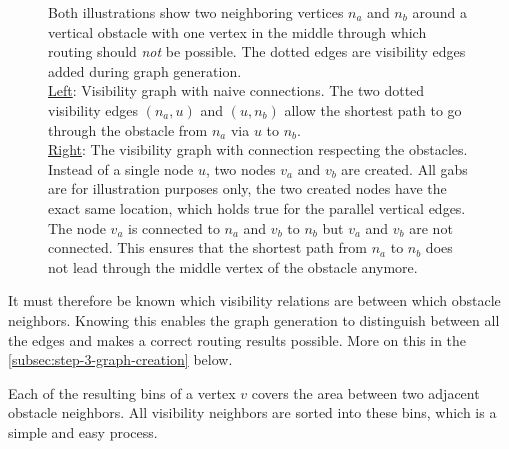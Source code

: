 \begin{figure}[h]
\begin{figcenter}
				\end{figcenter}
				\caption{
					Both illustrations show two neighboring vertices $n_a$ and $n_b$ around a vertical obstacle with one vertex in the middle through which routing should \emph{not} be possible.
					The dotted edges are visibility edges added during graph generation.
					\\
					\underline{Left}:
					Visibility graph with naive connections.
					The two dotted visibility edges $(n_a, u)$ and $(u, n_b)$ allow the shortest path to go through the obstacle from $n_a$ via $u$ to $n_b$.
					\\
					\underline{Right}:
					The visibility graph with connection respecting the obstacles. Instead of a single node $u$, two nodes $v_a$ and $v_b$ are created.
					All gabs are for illustration purposes only, the two created nodes have the exact same location, which holds true for the parallel vertical edges.
					The node $v_a$ is connected to $n_a$ and $v_b$ to $n_b$ but $v_a$ and $v_b$ are not connected.
					This ensures that the shortest path from $n_a$ to $n_b$ does not lead through the middle vertex of the obstacle anymore.
				}
				\label{fig:routing-through-line-obstacle}
			\end{figure}
			
			It must therefore be known which visibility relations are between which obstacle neighbors.
			Knowing this enables the graph generation to distinguish between all the edges and makes a correct routing results possible.
			More on this in the \cref{subsec:step-3-graph-creation} below.
			
			Each of the resulting bins of a vertex $v$ covers the area between two adjacent obstacle neighbors.
			All visibility neighbors are sorted into these bins, which is a simple and easy process.
			
